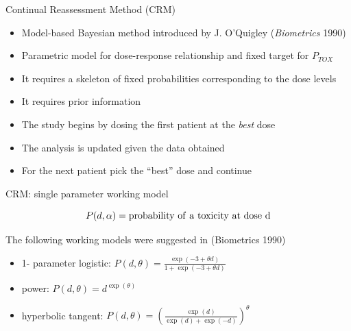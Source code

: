 \documentclass{beamer}
\begin{document}
\begin{frame}{Continual Reassessment Method (CRM)}

\begin{itemize}
\itemsep1pt\parskip0pt
\item
  Model-based Bayesian method introduced by J. O'Quigley
  (\emph{Biometrics} 1990)
\item
  Parametric model for dose-response relationship and fixed target for
  \(P_{TOX}\)
\item
  It requires a skeleton of fixed probabilities corresponding to the
  dose levels
\item
  It requires prior information
\item
  The study begins by dosing the first patient at the \emph{best} dose
\item
  The analysis is updated given the data obtained
\item
  For the next patient pick the ``best'' dose and continue
\end{itemize}

\end{frame}

\begin{frame}{CRM: single parameter working model}

\[
P(d, \alpha) = \rm{probability\  of \ a \ toxicity\ at\ dose\ d}
\]

The following working models were suggested in (Biometrics 1990)

\begin{itemize}
\itemsep1pt\parskip0pt
\item
  1- parameter logistic:
  \(P(d,\theta) = \frac{\exp(-3+\theta d)}{1+ \exp(-3+\theta d)}\)
\item
  power: \(P(d,\theta) = d^{\exp(\theta)}\)
\item
  hyperbolic tangent:
  \(P(d,\theta) = \left(\frac{\exp(d)}{\exp(d)+\exp(-d)}\right)^\theta\)
\end{itemize}

\end{frame}
\end{document}
